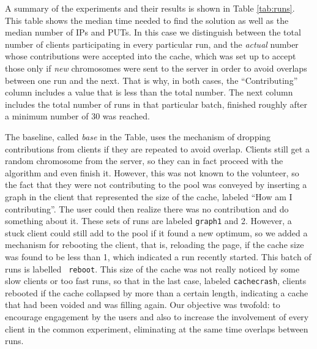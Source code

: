 \documentclass[runningheads,a4paper]{llncs}\usepackage[]{graphicx}\usepackage[]{color}
\begin{document}
A summary of the experiments and  their results is shown in Table
\ref{tab:runs}. This table shows the median time needed to find the
solution as well as the median number of IPs and PUTs. In this case we
distinguish between the total number of clients participating in every
particular run, and the {\em actual} number whose contributions were
accepted into the cache, which was set up to accept those only if {\em
  new} chromosomes were sent to the server in order to avoid overlaps
between one run and the next. That is why, in both cases, the
``Contributing'' column includes a value that is less than the total
number. The next column includes the total number of runs in that
particular batch, finished roughly after a minimum number of 30 was reached. 

The baseline, called {\em base} in the Table, uses the
mechanism of dropping contributions from clients if they are repeated
to avoid overlap. Clients still get a random chromosome from the
server, so they can in fact proceed with the algorithm and even finish
it. However, this was not known to the volunteer, so the fact that they were not contributing to the pool was
conveyed by inserting a graph in the client that represented the size
of the cache, labeled ``How am I contributing''. The user could
then realize there was no contribution and do something
about it. These sets of runs are labeled {\tt graph1} and 2. However, a stuck
client could still add to the pool if it found a new optimum, so we
added a mechanism for rebooting the client, that is, reloading the
page, if the cache size was found to be less than 1, which indicated a
run recently started. This batch of runs is labelled {\tt
  reboot}. This size of the cache was not really noticed by some slow clients or too fast runs, so that in the
last case, labeled {\tt cachecrash}, clients rebooted if the cache
collapsed by more than a certain length, indicating a cache that had
been voided and was filling again. Our objective was twofold: to
encourage engagement by the users and also to increase the involvement
of every client in the common experiment, eliminating at the same time
overlaps between runs. 
\end{document}
